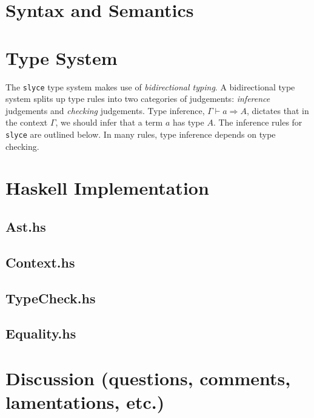 \section{Syntax and Semantics}
\section{Type System}
The \texttt{slyce} type system makes use of \emph{bidirectional typing}. 
A bidirectional type system splits up type rules into two categories of judgements: \emph{inference} judgements and \emph{checking} judgements.
Type inference, $\Gamma\vdash a \Rightarrow A$\footnotemark, dictates that in the context $\Gamma$, we should infer that a term $a$ has type $A$.
The inference rules for \texttt{slyce} are outlined below.
In many rules, type inference depends on type checking.




\section{Haskell Implementation}
\subsection{Ast.hs}
\subsection{Context.hs}
\subsection{TypeCheck.hs}
\subsection{Equality.hs}
\section{Discussion (questions, comments, lamentations, etc.)}

